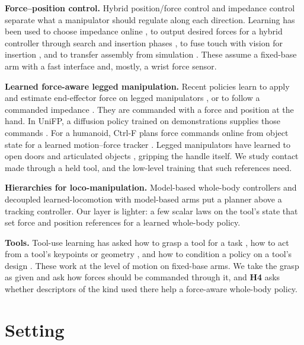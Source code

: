\documentclass[conference]{IEEEtran}
\newcommand{\hyp}[1]{\textbf{H#1}}
\begin{document}
\textbf{Force--position control.} Hybrid position/force control \citep{raibert1981hybrid} and impedance control
\citep{hogan1985impedance} separate what a manipulator should regulate along each direction. Learning has been used to
choose impedance online \citep{martinmartin2019vices}, to output desired forces for a hybrid controller through search and
insertion phases \citep{inoue2017deep}, to fuse touch with vision for insertion \citep{lee2019making}, and to transfer
assembly from simulation \citep{tang2023industreal}. These assume a fixed-base arm with a fast interface and, mostly,
a wrist force sensor.

\textbf{Learned force-aware legged manipulation.} Recent policies learn to apply and estimate end-effector force on legged
manipulators \citep{portela2024learning, zhi2025unified}, or to follow a commanded impedance \citep{xu2025facet}. They are
commanded with a force and position at the hand. In UniFP, a diffusion policy trained on demonstrations supplies those
commands \citep{zhi2025unified}. For a humanoid, Ctrl-F plans force commands online from object state for a learned
motion--force tracker \citep{zhao2026ctrlf}. Legged manipulators have learned to open doors and articulated objects
\citep{zhang2025doors, sleiman2025guided, lim2026openheart}, gripping the handle itself. We study contact made through a
held tool, and the low-level training that such references need.

\textbf{Hierarchies for loco-manipulation.} Model-based whole-body controllers \citep{bellicoso2019alma,
sleiman2021unified} and decoupled learned-locomotion with model-based arms \citep{ma2022combining} put a planner above a
tracking controller. Our layer is lighter: a few scalar laws on the tool's state that set force and position references
for a learned whole-body policy.

\textbf{Tools.} Tool-use learning has asked how to grasp a tool for a task \citep{fang2018tog}, how to act from a
tool's keypoints or geometry \citep{qin2020keto, qi2024toolgen}, and how to condition a policy on a tool's design
\citep{liu2023designuse}. These work at the level of motion on fixed-base arms. We take the grasp as given and ask how
forces should be commanded through it, and \hyp{4} asks whether descriptors of the kind used there help a force-aware
whole-body policy.

\section{Setting}
\label{sec:setting}
\end{document}
